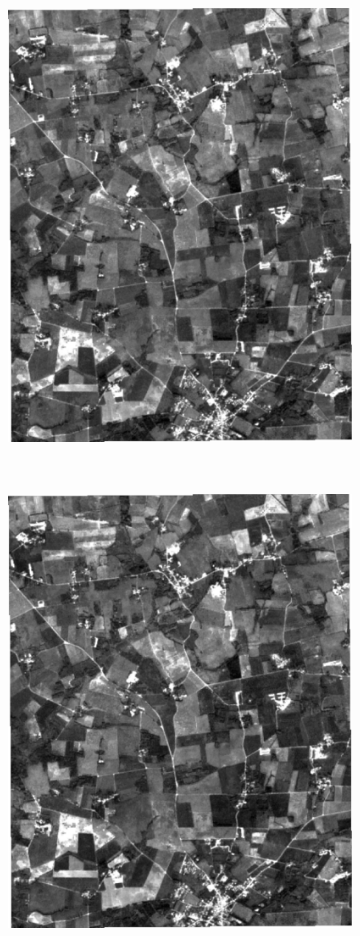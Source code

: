 \documentclass[journal,article,submit,pdftex,moreauthors]{Definitions/mdpi}
\begin{document}
\begin{figure}[H]
\begin{subfigure}[t]{0.23\linewidth}
    \caption{}
	\label{fig:r_aes_b2_2}
	\end{subfigure}
	\begin{subfigure}[t]{0.23\linewidth}
		\centering
		\includegraphics[height=\linewidth,width=0.95\linewidth]{figures/reconstruction_errors/reconstruction_B2_AEs3.pdf}
    \caption{}
	\label{fig:r_aes_b2_3}
	\end{subfigure}\\[0.2cm]
	\begin{subfigure}[t]{0.23\linewidth}
		\centering
		\includegraphics[height=\linewidth,width=0.95\linewidth]{figures/reconstruction_errors/reconstruction_B2_AEs4.pdf}

\end{subfigure}
\end{figure}
\end{document}
